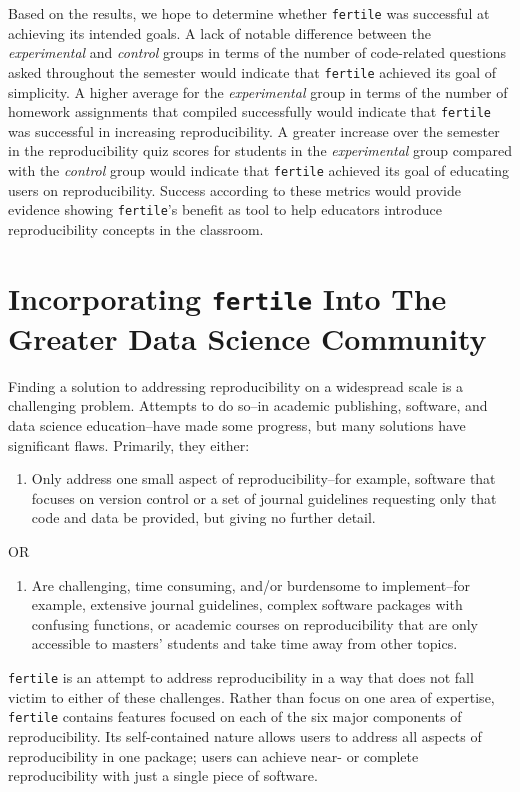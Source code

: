 \documentclass[12pt,twoside]{reedthesis}
\providecommand{\tightlist}{%
  \setlength{\itemsep}{0pt}\setlength{\parskip}{0pt}}
\begin{document}
Based on the results, we hope to determine whether \texttt{fertile} was
successful at achieving its intended goals. A lack of notable difference
between the \emph{experimental} and \emph{control} groups in terms of
the number of code-related questions asked throughout the semester would
indicate that \texttt{fertile} achieved its goal of simplicity. A higher
average for the \emph{experimental} group in terms of the number of
homework assignments that compiled successfully would indicate that
\texttt{fertile} was successful in increasing reproducibility. A greater
increase over the semester in the reproducibility quiz scores for
students in the \emph{experimental} group compared with the
\emph{control} group would indicate that \texttt{fertile} achieved its
goal of educating users on reproducibility. Success according to these
metrics would provide evidence showing \texttt{fertile}'s benefit as
tool to help educators introduce reproducibility concepts in the
classroom.

\chapter{\texorpdfstring{Incorporating \texttt{fertile} Into The Greater
Data Science
Community}{Incorporating fertile Into The Greater Data Science Community}}\label{applications}

Finding a solution to addressing reproducibility on a widespread scale
is a challenging problem. Attempts to do so--in academic publishing,
software, and data science education--have made some progress, but many
solutions have significant flaws. Primarily, they either:
\begin{enumerate}
\def\labelenumi{\Alph{enumi})}
\tightlist
\item
  Only address one small aspect of reproducibility--for example,
  software that focuses on version control or a set of journal
  guidelines requesting only that code and data be provided, but giving
  no further detail.
\end{enumerate}
\begin{center}
OR
\end{center}
\begin{enumerate}
\def\labelenumi{\Alph{enumi})}
\setcounter{enumi}{1}
\tightlist
\item
  Are challenging, time consuming, and/or burdensome to implement--for
  example, extensive journal guidelines, complex software packages with
  confusing functions, or academic courses on reproducibility that are
  only accessible to masters' students and take time away from other
  topics.
\end{enumerate}
\texttt{fertile} is an attempt to address reproducibility in a way that
does not fall victim to either of these challenges. Rather than focus on
one area of expertise, \texttt{fertile} contains features focused on
each of the six major components of reproducibility. Its self-contained
nature allows users to address all aspects of reproducibility in one
package; users can achieve near- or complete reproducibility with just a
single piece of software.
\end{document}
